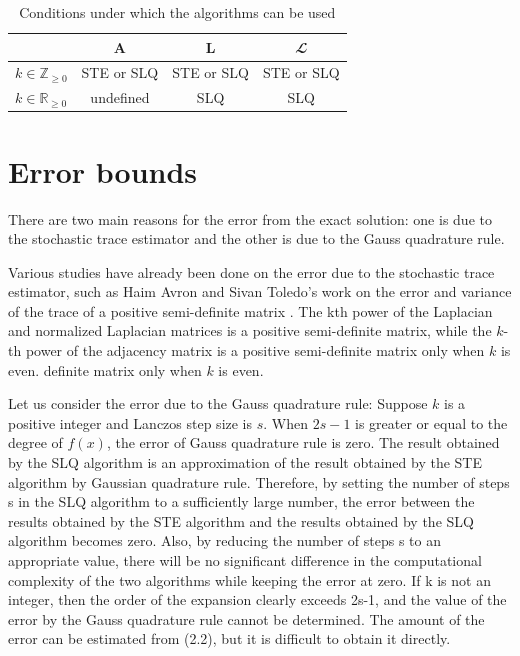 \documentclass[senior,final,11pt]{iscs-thesis}
\begin{document}
\begin{table}[htb]
    \begin{center}
      \begin{tabular}{l| c c c }
       & ${\mathbf A}$ & ${\mathbf L}$ & ${\mathbfcal L}$ \\ \hline
        $k\in \mathbb{Z}_{\geq 0}$ & STE or SLQ  & STE or SLQ  & STE or SLQ \\
        $k\in \mathbb{R}_{\geq 0}$&  undefined  & SLQ  &  SLQ \\
      \end{tabular}
      \caption{Conditions under which the algorithms can be used}
      \label{tab:notion}
    \end{center}
  \end{table}

\section{Error bounds}
There are two main reasons for the error from the exact solution: one is due to the stochastic trace estimator and the other is due to the Gauss quadrature rule.

Various studies have already been done on the error due to the stochastic trace estimator, such as Haim Avron and Sivan Toledo's work on the error and variance of the trace of a positive semi-definite matrix \cite{avron2011randomized}. The kth power of the Laplacian and normalized Laplacian matrices is a positive semi-definite matrix, while the $k$-th power of the adjacency matrix is a positive semi-definite matrix only when $k$ is even. definite matrix only when $k$ is even.

Let us consider the error due to the Gauss quadrature rule: Suppose $k$ is a positive integer and Lanczos step size is $s$. When $2s-1$ is greater or equal to the degree of $f(x)$, the error of Gauss quadrature rule is zero. The result obtained by the SLQ algorithm is an approximation of the result obtained by the STE algorithm by Gaussian quadrature rule. Therefore, by setting the number of steps s in the SLQ algorithm to a sufficiently large number, the error between the results obtained by the STE algorithm and the results obtained by the SLQ algorithm becomes zero. Also, by reducing the number of steps s to an appropriate value, there will be no significant difference in the computational complexity of the two algorithms while keeping the error at zero.
If k is not an integer, then the order of the expansion clearly exceeds 2s-1, and the value of the error by the Gauss quadrature rule cannot be determined. The amount of the error can be estimated from (2.2), but it is difficult to obtain it directly.
\end{document}
